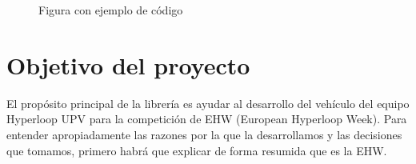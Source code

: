 \documentclass{report}
\begin{document}
\begin{figure}
\caption{Figura con ejemplo de código}
\label{FormatFigureExample}
\end{figure}

\setlength{\parindent}{15pt}
\newpage

\section{Objetivo del proyecto}
El propósito principal de la librería es ayudar al desarrollo del vehículo del equipo Hyperloop UPV para la competición de EHW (European Hyperloop Week). Para entender apropiadamente las razones por la que la desarrollamos y las decisiones que tomamos, primero habrá que explicar de forma resumida que es la EHW. \cite{web:EHW:homepage} \par \vspace{0.3 cm}
\end{document}
